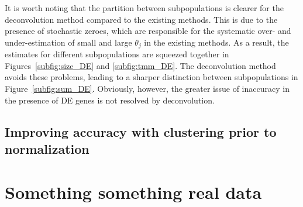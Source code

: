 \documentclass{article}
\begin{document}
It is worth noting that the partition between subpopulations is clearer for the deconvolution method compared to the existing methods.
This is due to the presence of stochastic zeroes, which are responsible for the systematic over- and under-estimation of small and large $\theta_j$ in the existing methods.
As a result, the estimates for different subpopulations are squeezed together in Figures~\ref{subfig:size_DE} and \ref{subfig:tmm_DE}.
The deconvolution method avoids these problems, leading to a sharper distinction between subpopulations in Figure~\ref{subfig:sum_DE}. 
Obviously, however, the greater issue of inaccuracy in the presence of DE genes is not resolved by deconvolution.

\subsection{Improving accuracy with clustering prior to normalization}

\section{Something something real data}



\end{document}
